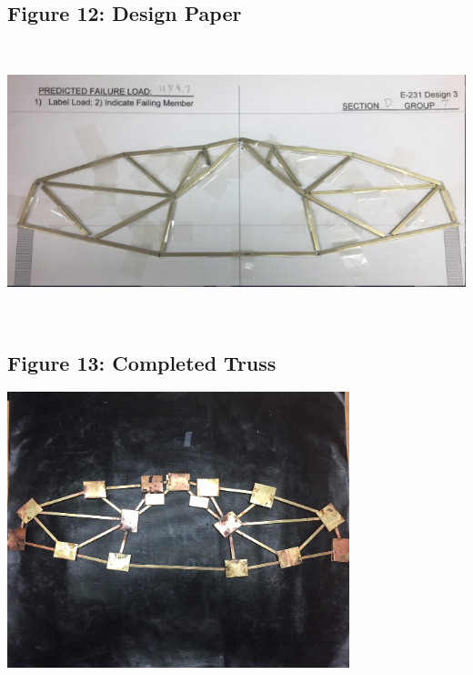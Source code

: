 \documentclass{article}
\begin{document}
\subsection{Figure 12: Design Paper}
\begin{center}{\includegraphics[height=8cm]{DesignPaper.png}}\end{center}

\subsection{Figure 13: Completed Truss}
\begin{center}{\includegraphics[height=8cm]{BrassTruss.jpg}}\end{center}
\end{document}
